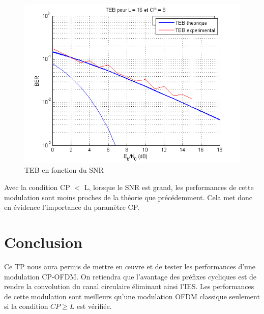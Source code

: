 \documentclass[11pt]{article}
\begin{document}
		\begin{figure}[H]
			\centering
			\includegraphics[scale=0.6]{img/teb2.jpg}
			\caption{TEB en fonction du SNR}
			\label{teb2}
		\end{figure}
		
		Avec la condition CP $<$ L, lorsque le SNR est grand, les performances de cette modulation sont moins proches de la théorie que précédemment. Cela met donc en évidence l'importance du paramètre CP.
		
		\section{Conclusion}
		Ce TP nous aura permis de mettre en œuvre et de tester les performances d'une modulation CP-OFDM. On retiendra que l'avantage des préfixes cycliques est de rendre la convolution du canal circulaire éliminant ainsi l'IES. Les performances de cette modulation sont meilleurs qu'une modulation OFDM classique seulement si la condition $CP \geq L$ est vérifiée.
\end{document}
